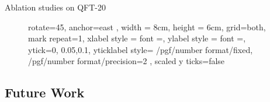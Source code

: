 \documentclass{beamer}
\begin{document}
\begin{frame}{Ablation studies on QFT-20}
\begin{figure}
{{{                rotate=45,
                anchor=east
            },
            width = 8cm,
            height = 6cm,
            grid=both,
            mark repeat=1,
            xlabel style = {font =\Large},
            ylabel style = {font =\Large}, 
            ytick={0, 0.05,0.1},
            yticklabel style={
            /pgf/number format/fixed,
            /pgf/number format/precision=2
            },
            scaled y ticks=false
        }
    }
    \begin{minipage}[b]{0.45\textwidth}
            \centering
            \scalebox{0.5}{}
        \end{minipage}
        \hfill
        \begin{minipage}[b]{0.45\textwidth}
            \centering
            \scalebox{0.5}{}
        \end{minipage}

        \vspace{0.5cm}

        \begin{minipage}[b]{0.45\textwidth}
            \centering
            \scalebox{0.5}{}
        \end{minipage}
        \hfill
        \begin{minipage}[b]{0.45\textwidth}
            \centering
            \scalebox{0.5}{}
        \end{minipage}
\end{figure}
\end{frame}
\subsection{Future Work}
\end{document}
